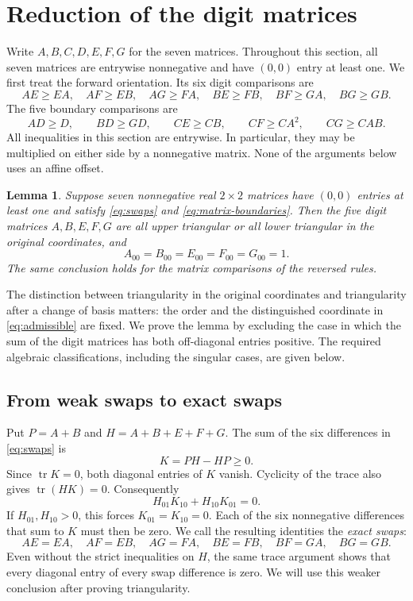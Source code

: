 \documentclass[11pt,a4paper]{article}
\newtheorem{lemma}[theorem]{Lemma}
\newcommand{\tr}{\operatorname{tr}}
\begin{document}
\section{Reduction of the digit matrices}
\label{sec:matrix-reduction}
Write $A,B,C,D,E,F,G$ for the seven matrices. Throughout this section,
all seven matrices are entrywise nonnegative and have $(0,0)$ entry at
least one. We first treat the forward orientation. Its six digit
comparisons are
\begin{equation}\label{eq:swaps}
AE\ge EA,\quad AF\ge EB,\quad AG\ge FA,\quad
BE\ge FB,\quad BF\ge GA,\quad BG\ge GB.
\end{equation}
The five boundary comparisons are
\begin{equation}\label{eq:matrix-boundaries}
AD\ge D,\qquad BD\ge GD,\qquad
CE\ge CB,\qquad CF\ge CA^2,\qquad CG\ge CAB.
\end{equation}
All inequalities in this section are entrywise. In particular, they may
be multiplied on either side by a nonnegative matrix. None of the
arguments below uses an affine offset.

\begin{lemma}\label{lem:matrix}
Suppose seven nonnegative real $2\times2$ matrices have $(0,0)$ entries
at least one and satisfy \eqref{eq:swaps} and
\eqref{eq:matrix-boundaries}. Then the five digit matrices
$A,B,E,F,G$ are all upper triangular or all lower triangular in the
original coordinates, and
\[
A_{00}=B_{00}=E_{00}=F_{00}=G_{00}=1.
\]
The same conclusion holds for the matrix comparisons of the reversed
rules.
\end{lemma}

The distinction between triangularity in the original coordinates and
triangularity after a change of basis matters: the order and the
distinguished coordinate in \eqref{eq:admissible} are fixed. We prove
the lemma by excluding the case in which the sum of the digit matrices
has both off-diagonal entries positive. The required algebraic
classifications, including the singular cases, are given below.

\subsection{From weak swaps to exact swaps}
Put $P=A+B$ and $H=A+B+E+F+G$. The sum of the six differences in
\eqref{eq:swaps} is
\[
K=PH-HP\ge0.
\]
Since $\tr K=0$, both diagonal entries of $K$ vanish. Cyclicity of the
trace also gives $\tr(HK)=0$. Consequently
\[
H_{01}K_{10}+H_{10}K_{01}=0.
\]
If $H_{01},H_{10}>0$, this forces $K_{01}=K_{10}=0$. Each of the six
nonnegative differences that sum to $K$ must then be zero. We call the
resulting identities the \emph{exact swaps}:
\begin{equation}\label{eq:exact-swaps}
AE=EA,\quad AF=EB,\quad AG=FA,\quad
BE=FB,\quad BF=GA,\quad BG=GB.
\end{equation}
Even without the strict inequalities on $H$, the same trace argument
shows that every diagonal entry of every swap difference is zero. We
will use this weaker conclusion after proving triangularity.
\end{document}
